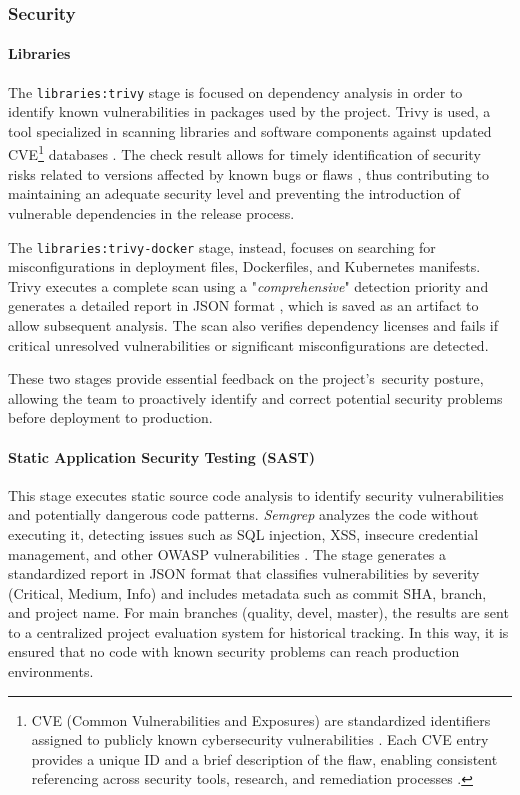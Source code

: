 \subsubsection{Security}
\paragraph{Libraries}
The \texttt{libraries:trivy} stage is focused on dependency analysis in order to identify known vulnerabilities in packages used by the project. Trivy is used, a tool specialized in scanning libraries and software components against updated CVE\footnote{CVE (Common Vulnerabilities and Exposures) are standardized identifiers assigned to publicly known cybersecurity vulnerabilities \cite{cve}. Each CVE entry provides a unique ID and a brief description of the flaw, enabling consistent referencing across security tools, research, and remediation processes \cite{cve}.} databases \cite{trivy}. The check result allows for timely identification of security risks related to versions affected by known bugs or flaws \cite{trivy}, thus contributing to maintaining an adequate security level and preventing the introduction of vulnerable dependencies in the release process.

The \texttt{libraries:trivy-docker} stage, instead, focuses on searching for misconfigurations in deployment files, Dockerfiles, and Kubernetes manifests. Trivy executes a complete scan using a "\textit{comprehensive}" detection priority and generates a detailed report in JSON format \cite{trivy}, which is saved as an artifact to allow subsequent analysis. The scan also verifies dependency licenses and fails if critical unresolved vulnerabilities or significant misconfigurations are detected.

These two stages provide essential feedback on the project's~security posture, allowing the team to proactively identify and correct potential security problems before deployment to production.

\paragraph{Static Application Security Testing (SAST)}
This stage executes static source code analysis to identify security vulnerabilities and potentially dangerous code patterns. \textit{Semgrep} analyzes the code without executing it, detecting issues such as SQL injection, XSS, insecure credential management, and other OWASP vulnerabilities \cite{semgrep}. The stage generates a standardized report in JSON format that classifies vulnerabilities by severity (Critical, Medium, Info) and includes metadata such as commit SHA, branch, and project name. For main branches (quality, devel, master), the results are sent to a centralized project evaluation system for historical tracking. In this way, it is ensured that no code with known security problems can reach production environments.

